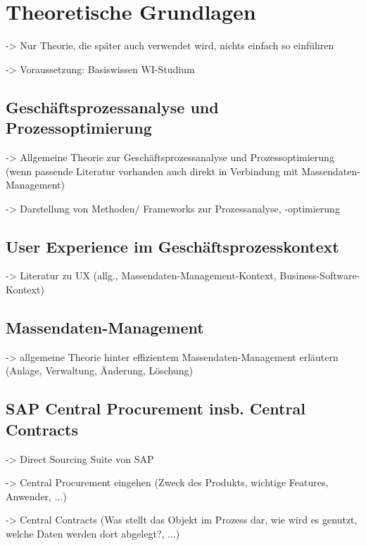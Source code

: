 \chapter{Theoretische Grundlagen}

-> Nur Theorie, die später auch verwendet wird, nichts einfach so einführen

-> Voraussetzung: Basiswissen WI-Studium

\section{Geschäftsprozessanalyse und Prozessoptimierung}

-> Allgemeine Theorie zur Geschäftsprozessanalyse und Prozessoptimierung (wenn passende Literatur vorhanden auch direkt in Verbindung mit Massendaten-Management)

-> Darstellung von Methoden/ Frameworks zur Prozessanalyse, -optimierung

\section{User Experience im Geschäftsprozesskontext}

-> Literatur zu UX (allg., Massendaten-Management-Kontext, Business-Software-Kontext)

\section{Massendaten-Management}

-> allgemeine Theorie hinter effizientem Massendaten-Management erläutern (Anlage, Verwaltung, Änderung, Löschung)

\section{SAP Central Procurement insb. Central Contracts}

-> Direct Sourcing Suite von SAP

-> Central Procurement eingehen (Zweck des Produkts, wichtige Features, Anwender, ...)

-> Central Contracts (Was stellt das Objekt im Prozess dar, wie wird es genutzt, welche Daten werden dort abgelegt?, ...)